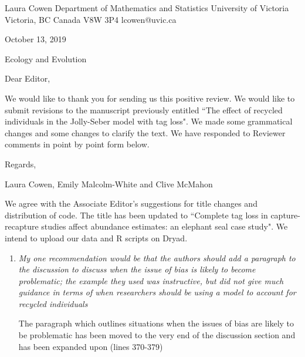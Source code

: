\documentclass[12pt]{article}
\begin{document}
\noindent Laura Cowen \newline
\noindent Department of Mathematics and Statistics \newline
\noindent University of Victoria \newline
\noindent Victoria, BC \newline
\noindent Canada V8W 3P4 \newline
\noindent lcowen@uvic.ca \newline

\bigskip

\bigskip

\noindent \normalsize October 13, 2019
\bigskip





\noindent Ecology and Evolution


\bigskip


\bigskip
\noindent Dear Editor,

\bigskip

We would like to thank you for sending us this positive review.  We would like to submit revisions to the manuscript previously entitled ``The effect of recycled individuals in the Jolly-Seber model with tag loss".  We made some grammatical changes and some changes to clarify the text. We have responded to Reviewer comments in point by point form below. 

\bigskip

Regards,

\bigskip


Laura Cowen, Emily Malcolm-White and Clive McMahon


\newpage

\bigskip



We agree with the Associate Editor's suggestions for title changes and distribution of code. The title has been updated to ``Complete tag loss in capture-recapture studies affect abundance estimates: an elephant seal case study". We intend to upload our data and R scripts on Dryad. 

\bigskip



\begin{enumerate}
\item  {\it My one recommendation would be that the authors should add a paragraph to the discussion to discuss when the issue of bias is likely to become problematic;  the example they used was instructive,  but did not give much guidance in terms of when researchers should be using a model to account for recycled individuals}

The paragraph which outlines situations when the issues of bias are likely to be problematic has been moved to the very end of the discussion section and has been expanded upon (lines 370-379) 

\end{enumerate}
\end{document}
